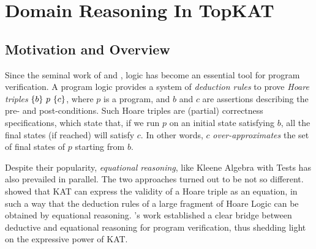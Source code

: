 \chapter{Domain Reasoning In TopKAT}
\label{chapter:TopKAT}
\thispagestyle{myheadings}

\section{Motivation and Overview}


Since the seminal work of \citet{Floyd67} and \citet{Hoare69}, logic has become
an essential tool for program verification.  A program logic provides a system
of \emph{deduction rules} to prove \emph{Hoare triples} \(\{b\}~p~\{c\}\),
where \(p\) is a program, and \(b\) and \(c\) are assertions describing the pre-
and post-conditions.  Such Hoare triples are (partial) correctness
specifications, which state that, if we run \(p\) on an initial state satisfying
\(b\), all the final states (if reached) will satisfy \(c\). In other words, \(c\)
\emph{over-approximates} the set of final states of \(p\) starting from \(b\). 

Despite their popularity, \emph{equational reasoning}, like Kleene Algebra with Tests has also prevailed in parallel.
The two approaches turned out to be not so different. \citet{Kozen_2000}
showed that KAT can express the validity of a Hoare triple as an equation, in
such a way that the deduction rules of a large fragment of Hoare Logic can be
obtained by equational reasoning.  \citeauthor{Kozen_2000}'s work
established a clear bridge between deductive and equational reasoning for
program verification, thus shedding light on the expressive power of KAT\@.

